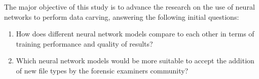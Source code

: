 
The major objective of this study is to advance the research on the use of neural networks to perform data carving, answering the following initial questions:


\begin{enumerate}[itemindent=\parindent,label=\textbf{Q\arabic*.}]

    \item How does different neural network models compare to each other in terms of training performance and quality of results?
    
    \item Which neural network models would be more suitable to accept the addition of new file types by the forensic examiners community? 

\end{enumerate}

